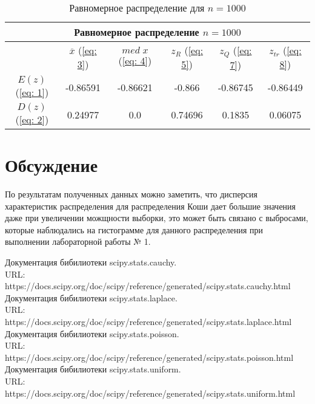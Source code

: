\documentclass{article}
\begin{document}
\begin{table}[hb]
\begin{center}
\begin{tabular}{|c|c|c|c|c|c|}
\hline 
\multicolumn{6}{|c|}{Равномерное распределение $n=1000$} \\ 
\hline 
  & $\overline{x}$ (\ref{eq: 3}) & $med \; x$ (\ref{eq: 4}) & $z_R$ (\ref{eq: 5}) & $z_Q$ (\ref{eq: 7}) & $z_{tr}$ (\ref{eq: 8}) \\ 
\hline 
$E(z)$ (\ref{eq: 1}) & -0.86591 & -0.86621 & -0.866 & -0.86745 & -0.86449 \\ 
\hline 
$D(z)$ (\ref{eq: 2}) & 0.24977 & 0.0 & 0.74696 & 0.1835 & 0.06075 \\ 
\hline 
\end{tabular} 
\caption{Равномерное распределение для $n=1000$}
\end{center}
\end{table}

\newpage
\section{Обсуждение}
По результатам полученных данных можно заметить, что дисперсия характеристик распределения для распределения Коши дает большие значения даже при увеличении можщности выборки, это может быть связано с выбросами, которые наблюдались на гистограмме для данного распределения при выполнении лабораторной работы № 1.

\newpage
\begin{thebibliography}{4}
Документация бибилиотеки scipy.stats.cauchy. 
\\ URL: https://docs.scipy.org/doc/scipy/reference/generated/scipy.stats.cauchy.html
Документация бибилиотеки scipy.stats.laplace. 
\\ URL: https://docs.scipy.org/doc/scipy/reference/generated/scipy.stats.laplace.html
Документация бибилиотеки scipy.stats.poisson.
\\ URL: https://docs.scipy.org/doc/scipy/reference/generated/scipy.stats.poisson.html
Документация бибилиотеки scipy.stats.uniform.
\\ URL: https://docs.scipy.org/doc/scipy/reference/generated/scipy.stats.uniform.html
\end{thebibliography}
\end{document}
